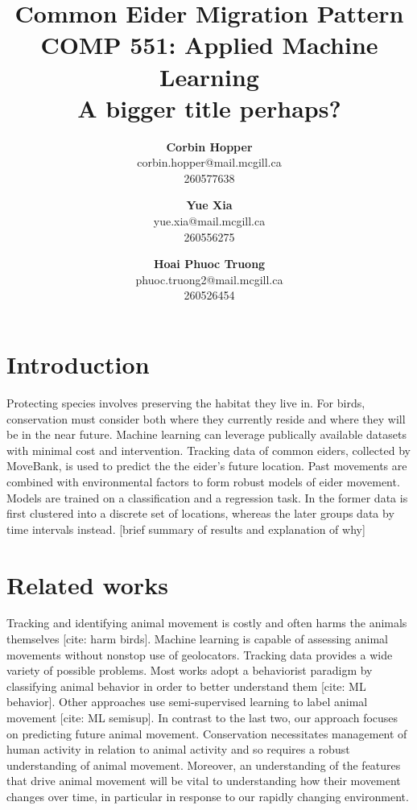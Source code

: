 \documentclass[10pt,conference]{IEEEtran}
\begin{document}
\title{\textbf{Common Eider Migration Pattern} \\
	\Large COMP 551: Applied Machine Learning \\
	A bigger title perhaps?
}
 
\author{
	\textbf{Corbin Hopper}\\corbin.hopper@mail.mcgill.ca\\260577638
	\and \textbf{Yue Xia}\\yue.xia@mail.mcgill.ca\\260556275
	\and \textbf{Hoai Phuoc Truong}\\phuoc.truong2@mail.mcgill.ca\\260526454
}

\maketitle
 
\section{Introduction}
    Protecting species involves preserving the habitat they live in.  For birds, conservation must consider both where they currently reside and where they will be in the near future.  Machine learning can leverage publically available datasets with minimal cost and intervention.  Tracking data of common eiders, collected by MoveBank, is used to predict the the eider's future location.  Past movements are combined with environmental factors to form robust models of eider movement.  Models are trained on a classification and a regression task.  In the former data is first clustered into a discrete set of locations, whereas the later groups data by time intervals instead.  [brief summary of results and explanation of why]

\section{Related works}
    Tracking and identifying animal movement is costly and often harms the animals themselves [cite: harm birds].  Machine learning is capable of assessing animal movements without nonstop use of geolocators.  Tracking data provides a wide variety of possible problems.  Most works adopt a behaviorist paradigm by classifying animal behavior in order to better understand them [cite: ML behavior].  Other approaches use semi-supervised learning to label animal movement [cite: ML semisup].  In contrast to the last two, our approach focuses on predicting future animal movement.  Conservation necessitates management of human activity in relation to animal activity and so requires a robust understanding of animal movement.  Moreover, an understanding of the features that drive animal movement will be vital to understanding how their movement changes over time, in particular in response to our rapidly changing environment.  
\end{document}
